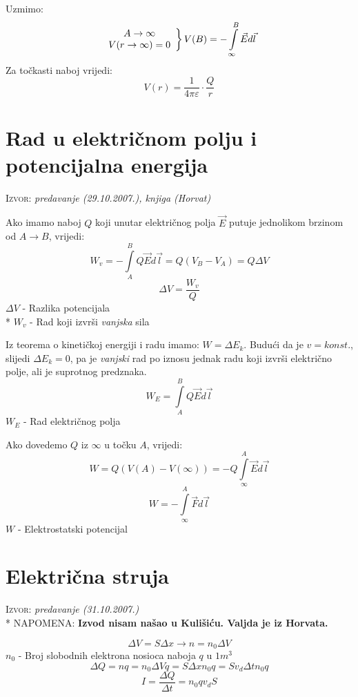 \documentclass{report}
\begin{document}
Uzmimo:
$$\left. {\begin{array}{*{20}c}
   {A \to \infty }  \\
   {V(r \to \infty ) = 0}  \\

 \end{array} } \right\}V(B) =  - \int\limits_\infty ^B {\vec Ed\vec l} $$
Za točkasti naboj vrijedi:
\begin{equation}
	V(r) = \frac{1}{4 \pi \varepsilon } \cdot \frac{Q}{r}
	\label{potencijal-tockastog-naboja}
\end{equation}

\section{Rad u električnom polju i potencijalna energija}
\small \textsc{Izvor:} \textit{predavanje (29.10.2007.), knjiga (Horvat)}

Ako imamo naboj $Q$ koji unutar električnog polja $\vec{E}$ putuje jednolikom brzinom od $A \to B$, vrijedi:
$$W _v = - \int \limits_A^B {Q \vec{E}d \vec{l}} = Q \left (V _B - V _A \right ) = Q \Delta V$$
\begin{equation}
	\Delta V = \frac{W _v}{Q}
	\label{razlika-potencijala-i-energija}
\end{equation}
$\Delta V$ - Razlika potencijala\\*
$W _v$ - Rad koji izvrši \textit{vanjska} sila

Iz teorema o kinetičkoj energiji i radu imamo: $W = \Delta E _k$. Budući da je $v = konst.$, slijedi $\Delta E _k = 0$, pa je \textit{vanjski} rad po iznosu jednak radu koji izvrši električno polje, ali je suprotnog predznaka.
$$W _E = \int \limits_A^B {Q \vec{E} d \vec{l}}$$
$W _E$ - Rad električnog polja

Ako dovedemo $Q$ iz $\infty $ u točku $A$, vrijedi:
$$W = Q \left (V(A) - V(\infty ) \right ) = - Q \int \limits_\infty ^A {\vec{E}d \vec{l}}$$
$$W = - \int \limits_\infty ^A {\vec{F}d \vec{l}}$$
$W$ - Elektrostatski potencijal

\section{Električna struja}
\small \textsc{Izvor:} \textit{predavanje (31.10.2007.)}\\*
\small \textsc{NAPOMENA:} \textbf{Izvod nisam našao u Kulišiću. Valjda je iz Horvata.}

$$\Delta V = S \Delta x \to n = n _0 \Delta V $$
$n _0$ - Broj slobodnih elektrona nosioca naboja $q$ u $1 m^3$
$$\Delta Q = nq = n _0 \Delta V q = S \Delta x n _0 q = S v _d \Delta t n _0 q $$
$$I = \frac{\Delta Q}{\Delta t} = n _0 q v _d S $$
\end{document}
